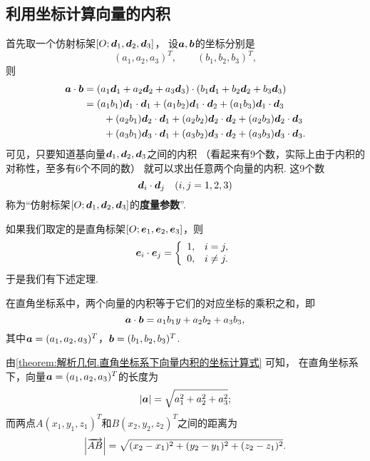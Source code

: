 \subsection{利用坐标计算向量的内积}
首先取一个仿射标架\([O;\boldsymbol{d}_1,\boldsymbol{d}_2,\boldsymbol{d}_3]\)，
设\(\boldsymbol{a},\boldsymbol{b}\)的坐标分别是\[
	(a_1,a_2,a_3)^T, \qquad
	(b_1,b_2,b_3)^T,
\]
则\begin{equation}
	\begin{split}
	\boldsymbol{a}\cdot\boldsymbol{b}
	&= (a_1 \boldsymbol{d}_1 + a_2 \boldsymbol{d}_2 + a_3 \boldsymbol{d}_3)
	\cdot (b_1 \boldsymbol{d}_1 + b_2 \boldsymbol{d}_2 + b_3 \boldsymbol{d}_3) \\
	&= (a_1 b_1) \boldsymbol{d}_1 \cdot \boldsymbol{d}_1
	+ (a_1 b_2) \boldsymbol{d}_1 \cdot \boldsymbol{d}_2
	+ (a_1 b_3) \boldsymbol{d}_1 \cdot \boldsymbol{d}_3 \\
	&\hspace{20pt}
	+ (a_2 b_1) \boldsymbol{d}_2 \cdot \boldsymbol{d}_1
	+ (a_2 b_2) \boldsymbol{d}_2 \cdot \boldsymbol{d}_2
	+ (a_2 b_3) \boldsymbol{d}_2 \cdot \boldsymbol{d}_3 \\
	&\hspace{20pt}
	+ (a_3 b_1) \boldsymbol{d}_3 \cdot \boldsymbol{d}_1
	+ (a_3 b_2) \boldsymbol{d}_3 \cdot \boldsymbol{d}_2
	+ (a_3 b_3) \boldsymbol{d}_3 \cdot \boldsymbol{d}_3.
	\end{split}
\end{equation}
可见，只要知道基向量\(\boldsymbol{d}_1,\boldsymbol{d}_2,\boldsymbol{d}_3\)之间的内积
（看起来有9个数，实际上由于内积的对称性，至多有6个不同的数）
就可以求出任意两个向量的内积.
这9个数\[
	\boldsymbol{d}_i \cdot \boldsymbol{d}_j
	\quad(i,j=1,2,3)
\]称为“仿射标架\([O;\boldsymbol{d}_1,\boldsymbol{d}_2,\boldsymbol{d}_3]\)的\textbf{度量参数}”.

如果我们取定的是直角标架\([O;\boldsymbol{e}_1,\boldsymbol{e}_2,\boldsymbol{e}_3]\)，则\[
	\boldsymbol{e}_i \cdot \boldsymbol{e}_j = \left\{ \begin{array}{ll}
		1, & i = j, \\
		0, & i \neq j.
	\end{array} \right.
\]
于是我们有下述定理.
\begin{theorem}\label{theorem:解析几何.直角坐标系下向量内积的坐标计算式}
在直角坐标系中，两个向量的内积等于它们的对应坐标的乘积之和，即
\begin{equation}
	\boldsymbol{a}\cdot\boldsymbol{b}
	= a_1 b_1 y + a_2 b_2 + a_3 b_3,
\end{equation}
其中\(\boldsymbol{a}=(a_1,a_2,a_3)^T\)，\(\boldsymbol{b}=(b_1,b_2,b_3)^T\).
\end{theorem}

由\cref{theorem:解析几何.直角坐标系下向量内积的坐标计算式} 可知，
在直角坐标系下，向量\(\boldsymbol{a}=(a_1,a_2,a_3)^T\)的长度为\begin{equation}
	\abs{\boldsymbol{a}} = \sqrt{a_1^2+a_2^2+a_3^2};
\end{equation}
而两点\(A(x_1,y_1,z_1)^T\)和\(B(x_2,y_2,z_2)^T\)之间的距离为\begin{equation}
	\abs{\overrightarrow{AB}} = \sqrt{(x_2-x_1)^2+(y_2-y_1)^2+(z_2-z_1)^2}.
\end{equation}

